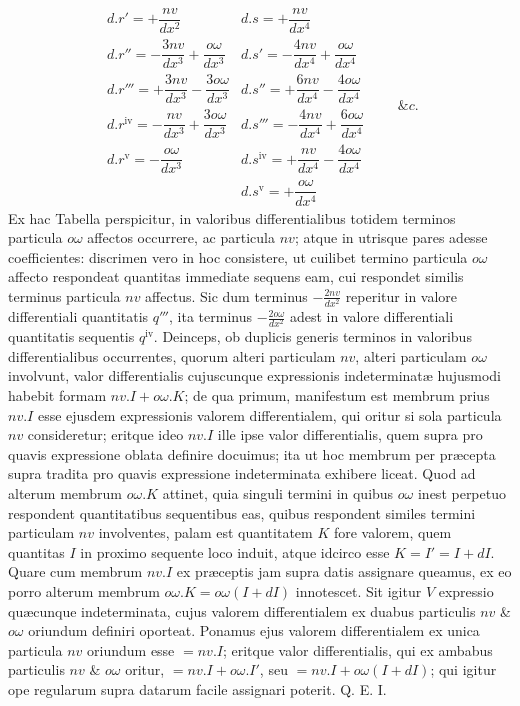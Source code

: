 \[
\renewcommand{\arraystretch}{1.7}
\begin{array}{l|l}
d.r'=+\dfrac{nv}{dx^2}&d.s=+\dfrac{nv}{dx^4}\\
d.r''=-\dfrac{3nv}{dx^3}+\dfrac{o\omega}{dx^3}&d.s'=-\dfrac{4nv}{dx^4}+\dfrac{o\omega}{dx^4}\\
d.r'''=+\dfrac{3nv}{dx^3}-\dfrac{3o\omega}{dx^3}&d.s''=+\dfrac{6nv}{dx^4}-\dfrac{4o\omega}{dx^4}\\
d.r^{\mathrm{iv}}=-\dfrac{nv}{dx^3}+\dfrac{3o\omega}{dx^3}&d.s'''=-\dfrac{4nv}{dx^4}+\dfrac{6o\omega}{dx^4}\\
d.r^{\mathrm{v}}=-\dfrac{o\omega}{dx^3}&d.s^{\mathrm{iv}}=+\dfrac{nv}{dx^4}-\dfrac{4o\omega}{dx^4}\\
&d.s^{\mathrm{v}}=+\dfrac{o\omega}{dx^4}
\end{array}\qquad\&c.
\]
Ex hac Tabella perspicitur, in valoribus differentialibus totidem terminos particula $o\omega$ affectos occurrere, ac particula $nv$; atque in utrisque pares adesse coefficientes: discrimen vero in hoc consistere, ut cuilibet termino particula $o\omega$ affecto respondeat quantitas immediate sequens eam, cui respondet similis terminus particula $nv$ affectus. Sic dum terminus $-\frac{2nv}{dx^2}$ reperitur in valore differentiali quantitatis $q'''$, ita terminus $-\frac{2o\omega}{dx^2}$ adest in valore differentiali quantitatis sequentis $q^{\mathrm{iv}}$. Deinceps, ob duplicis generis terminos in valoribus differentialibus occurrentes, quorum alteri particulam $nv$, alteri particulam $o\omega$ involvunt, valor differentialis cujuscunque expressionis indeterminatæ hujusmodi habebit formam $nv.I+o\omega.K$; de qua primum, manifestum est membrum prius $nv.I$ esse ejusdem expressionis valorem differentialem, qui oritur si sola particula $nv$ consideretur; eritque ideo $nv.I$ ille ipse valor differentialis, quem supra pro quavis expressione oblata definire docuimus; ita ut hoc membrum per præcepta supra tradita pro quavis expressione indeterminata exhibere liceat. Quod ad alterum membrum $o\omega.K$ attinet, quia singuli termini in quibus $o\omega$ inest perpetuo respondent quantitatibus sequentibus eas, quibus respondent similes termini particulam $nv$ involventes, palam est quantitatem $K$ fore valorem, quem quantitas $I$ in proximo sequente loco induit, atque idcirco esse $K=I'=I+dI$. Quare cum membrum $nv.I$ ex præceptis jam supra datis assignare queamus, ex eo porro alterum membrum $o\omega.K=o\omega(I+dI)$ innotescet. Sit igitur $V$ expressio quæcunque indeterminata, cujus valorem differentialem ex duabus particulis $nv$ \& $o\omega$ oriundum definiri oporteat. Ponamus ejus valorem differentialem ex unica particula $nv$ oriundum esse $=nv.I$; eritque valor differentialis, qui ex ambabus particulis $nv$ \& $o\omega$ oritur, $=nv.I+o\omega.I'$, seu $=nv.I+o\omega(I+dI)$; qui igitur ope regularum supra datarum facile assignari poterit. Q. E. I.

